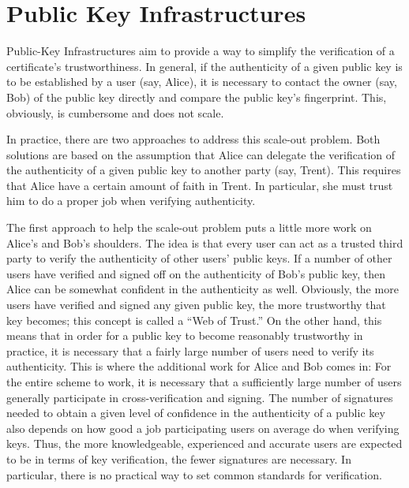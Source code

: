 \section{Public Key Infrastructures}

Public-Key Infrastructures aim to provide a way to simplify the
verification of a certificate's trustworthiness.  In general, if the
authenticity of a given public key is to be established by a user (say,
Alice), it is necessary to contact the owner (say, Bob) of the public key
directly and compare the public key's fingerprint.  This, obviously, is
cumbersome and does not scale.

In practice, there are two approaches to address this scale-out problem.
Both solutions are based on the assumption that Alice can delegate the
verification of the authenticity of a given public key to another party
(say, Trent).  This requires that Alice have a certain amount of faith in
Trent.  In particular, she must trust him to do a proper job when verifying
authenticity.

The first approach to help the scale-out problem puts a little more work on
Alice's and Bob's shoulders.  The idea is that every user can act as a
trusted third party to verify the authenticity of other users' public keys.
If a number of other users have verified and signed off on the authenticity
of Bob's public key, then Alice can be somewhat confident in the
authenticity as well.  Obviously, the more users have verified and signed
any given public key, the more trustworthy that key becomes; this concept
is called a ``Web of Trust.''  On the other hand, this means that in order
for a public key to become reasonably trustworthy in practice, it is
necessary that a fairly large number of users need to verify its
authenticity.  This is where the additional work for Alice and Bob comes
in: For the entire scheme to work, it is necessary that a sufficiently
large number of users generally participate in cross-verification and
signing.  The number of signatures needed to obtain a given level of
confidence in the authenticity of a public key also depends on how good a
job participating users on average do when verifying keys.  Thus, the more
knowledgeable, experienced and accurate users are expected to be in terms
of key verification, the fewer signatures are necessary.  In particular,
there is no practical way to set common standards for verification.

